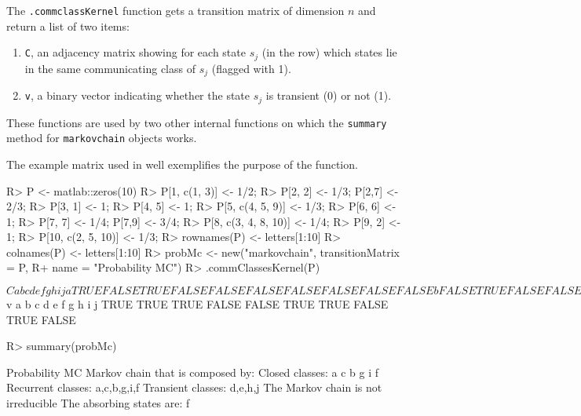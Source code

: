 \documentclass[
  nojss]{jss}
\providecommand{\tightlist}{%
  \setlength{\itemsep}{0pt}\setlength{\parskip}{0pt}}
\begin{document}
The \texttt{.commclassKernel} function gets a transition matrix of dimension \(n\) and return a list of two items:

\begin{enumerate}
\def\labelenumi{\arabic{enumi}.}
\tightlist
\item
  \texttt{C}, an adjacency matrix showing for each state \(s_{j}\) (in the row) which states lie in the same communicating class of \(s_{j}\) (flagged with 1).
\item
  \texttt{v}, a binary vector indicating whether the state \(s_{j}\) is transient (0) or not (1).
\end{enumerate}

These functions are used by two other internal functions on which the \texttt{summary} method for \texttt{markovchain} objects works.

The example matrix used in \cite{renaldoMatlab} well exemplifies the purpose of the function.

\begin{CodeChunk}

\begin{CodeInput}
R> P <- matlab::zeros(10)
R> P[1, c(1, 3)] <- 1/2;
R> P[2, 2] <- 1/3; P[2,7] <- 2/3;
R> P[3, 1] <- 1;
R> P[4, 5] <- 1;
R> P[5, c(4, 5, 9)] <- 1/3;
R> P[6, 6] <- 1;
R> P[7, 7] <- 1/4; P[7,9] <- 3/4;
R> P[8, c(3, 4, 8, 10)] <- 1/4;
R> P[9, 2] <- 1;
R> P[10, c(2, 5, 10)] <- 1/3;
R> rownames(P) <- letters[1:10] 
R> colnames(P) <- letters[1:10]
R> probMc <- new("markovchain", transitionMatrix = P, 
R+               name = "Probability MC")
R> .commClassesKernel(P)
\end{CodeInput}

\begin{CodeOutput}
$C
      a     b     c     d     e     f     g     h     i     j
a  TRUE FALSE  TRUE FALSE FALSE FALSE FALSE FALSE FALSE FALSE
b FALSE  TRUE FALSE FALSE FALSE FALSE  TRUE FALSE  TRUE FALSE
c  TRUE FALSE  TRUE FALSE FALSE FALSE FALSE FALSE FALSE FALSE
d FALSE FALSE FALSE  TRUE  TRUE FALSE FALSE FALSE FALSE FALSE
e FALSE FALSE FALSE  TRUE  TRUE FALSE FALSE FALSE FALSE FALSE
f FALSE FALSE FALSE FALSE FALSE  TRUE FALSE FALSE FALSE FALSE
g FALSE  TRUE FALSE FALSE FALSE FALSE  TRUE FALSE  TRUE FALSE
h FALSE FALSE FALSE FALSE FALSE FALSE FALSE  TRUE FALSE FALSE
i FALSE  TRUE FALSE FALSE FALSE FALSE  TRUE FALSE  TRUE FALSE
j FALSE FALSE FALSE FALSE FALSE FALSE FALSE FALSE FALSE  TRUE

$v
    a     b     c     d     e     f     g     h     i     j 
 TRUE  TRUE  TRUE FALSE FALSE  TRUE  TRUE FALSE  TRUE FALSE 
\end{CodeOutput}

\begin{CodeInput}
R> summary(probMc)
\end{CodeInput}

\begin{CodeOutput}
Probability MC  Markov chain that is composed by: 
Closed classes: 
a c 
b g i 
f 
Recurrent classes: 
{a,c},{b,g,i},{f}
Transient classes: 
{d,e},{h},{j}
The Markov chain is not irreducible 
The absorbing states are: f
\end{CodeOutput}
\end{CodeChunk}
\end{document}
